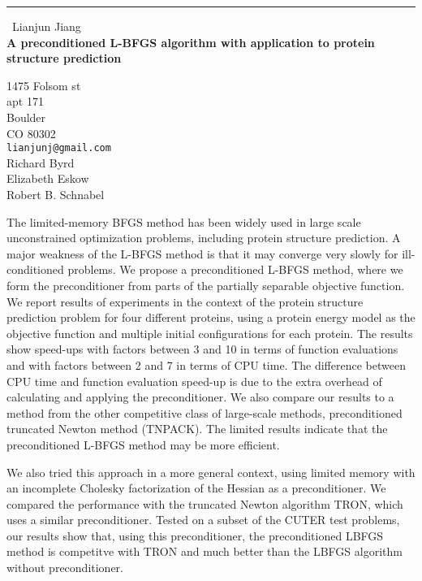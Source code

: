 \documentclass{report}
\begin{document}
\begin{center}
\rule{6in}{1pt} \
{\large Lianjun Jiang \\
{\bf A preconditioned L-BFGS algorithm with application to protein structure prediction}}

1475 Folsom st \\ apt 171 \\ Boulder \\ CO 80302
\\
{\tt lianjunj@gmail.com}\\
Richard Byrd\\
Elizabeth Eskow\\
	Robert B. Schnabel\end{center}

The limited-memory BFGS method has been widely used in large scale
unconstrained optimization problems, including protein
structure prediction. A major weakness of the L-BFGS method is that it
may converge very slowly for ill-conditioned problems. We propose a
preconditioned L-BFGS method, where we form the preconditioner from parts
of the partially separable objective function. We report results of
experiments in the context of the protein structure prediction problem
for four different proteins, using a protein energy model as the
objective function and multiple initial configurations for each protein.
The results show speed-ups with factors between 3 and 10 in terms of
function evaluations and with factors between 2 and 7 in terms of CPU
time. The difference between CPU time and function evaluation speed-up is
due to the extra overhead of calculating and applying the preconditioner.
We also compare our results to a method from the other competitive class
of large-scale methods, preconditioned truncated Newton method (TNPACK).
The limited results indicate that the preconditioned L-BFGS method may be
more efficient.

We also tried this approach in a more general context, using limited
memory with an incomplete Cholesky factorization of the Hessian as a
preconditioner. We compared the performance with the truncated Newton
algorithm TRON, which uses a similar preconditioner. Tested on a subset
of the CUTER test problems, our results show that, using this
preconditioner, the preconditioned LBFGS method is competitve with TRON
and much better than the LBFGS algorithm without preconditioner.
\end{document}
